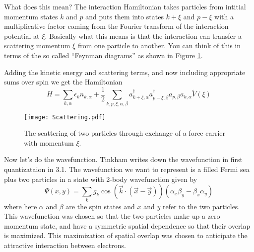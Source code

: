 \documentclass{article}
\begin{document}
What does this mean? The interaction Hamiltonian takes particles
from intitial momentum states $k$ and $p$ and puts them into states
$k+\xi$ and $p-\xi$ with a multiplicative factor coming from the
Fourier transform of the interaction potential at $\xi$. Basically
what this means is that the interaction can transfer a scattering
momentum $\xi$ from one particle to another. You can think of this
in terms of the so called {}``Feynman diagrams'' as shown in Figure
\ref{Flo:scattering}.

Adding the kinetic energy and scattering terms, and now including
appropriate sums over spin we get the Hamiltonian\[
H=\sum_{k,\alpha}\epsilon_{k}n_{k,\alpha}+\frac{1}{2}\sum_{k,p,\xi,\alpha,\beta}a_{k+\xi,\alpha}^{\dagger}a_{p-\xi,\beta}^{\dagger}a_{p,\beta}a_{k,\alpha}\tilde{V}(\xi)\]


%
\begin{figure}

\begin{centering}
\texttt{[image: Scattering.pdf]}
\par\end{centering}

\caption{The scattering of two particles through exchange of a force carrier
with momentum $\xi$.}
\label{Flo:scattering}
\end{figure}


Now let's do the wavefunction. Tinkham writes down the wavefunction
in first quantizataion in 3.1. The wavefunction we want to represent
is a filled Fermi sea plus two particles in a state with 2-body wavefunction
given by\[
\Psi(x,y)=\sum_{k}g_{k}\cos\left(\vec{k}\cdot(\vec{x}-\vec{y})\right)\left(\alpha_{x}\beta_{y}-\beta_{x}\alpha_{y}\right)\]
where here $\alpha$ and $\beta$ are the spin states and $x$ and
$y$ refer to the two particles. This wavefunction was chosen so that
the two particles make up a zero momentum state, and have a symmetric
spatial dependence so that their overlap is maximized. This maximization
of spatial overlap was chosen to anticipate the attractive interaction
between electrons.
\end{document}
